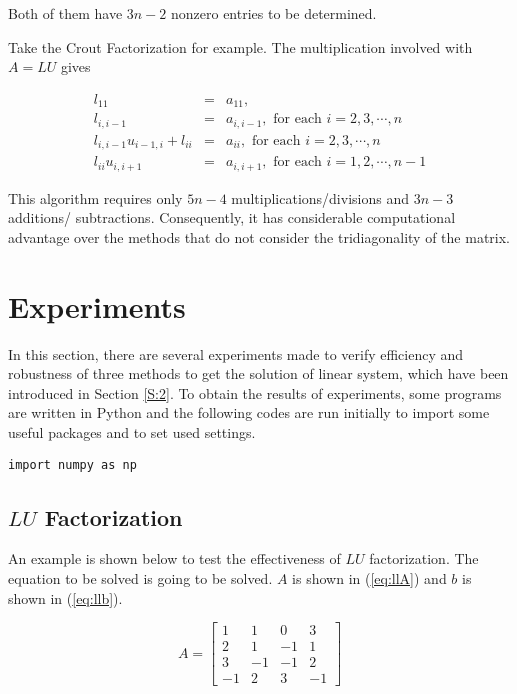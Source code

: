 \documentclass[preprint,12pt]{elsarticle}
\begin{document}
Both of them have $3n-2$ nonzero entries to be determined.

Take the Crout Factorization for example. The multiplication involved with $A=LU$ gives

\begin{eqnarray*}
  l_{11} &=& a_{11}, \\
  l_{i,i-1} &=& a_{i,i-1}, \text{ for each } i=2,3,\cdots, n\\
  l_{i,i-1}u_{i-1,i}+l_{ii} &=& a_{ii}, \text{ for each } i=2,3,\cdots, n\\
  l_{ii}u_{i,i+1}&=&a_{i,i+1},\text{ for each } i=1,2,\cdots, n-1
\end{eqnarray*}

This algorithm requires only $5n-4$ multiplications/divisions and $3n-3$ additions/ subtractions. Consequently, it has considerable computational advantage over the methods that do not consider the tridiagonality of the matrix.

\section{Experiments}
\label{S:3}

In this section, there are several experiments made to verify efficiency and robustness of three methods to get the solution of linear system, which have been introduced in Section \ref{S:2}. To obtain the results of experiments, some programs are written in Python and the following codes are run initially to import some useful packages and to set used settings.

\begin{lstlisting}
import numpy as np
\end{lstlisting}

\subsection{$LU$ Factorization}
\label{SS:3.1}

An example is shown below to test the effectiveness of $LU$ factorization. The equation to be solved is going to be solved. $A$ is shown in (\ref{eq:llA}) and $b$ is shown in (\ref{eq:llb}).

\begin{equation}
\label{eq:llA}
  A = 
  \begin{bmatrix}
    1 & 1 & 0 & 3 \\
    2 & 1 & -1 & 1 \\
    3 & -1 & -1 & 2 \\
    -1 & 2 & 3 & -1
  \end{bmatrix}
\end{equation}
\end{document}

